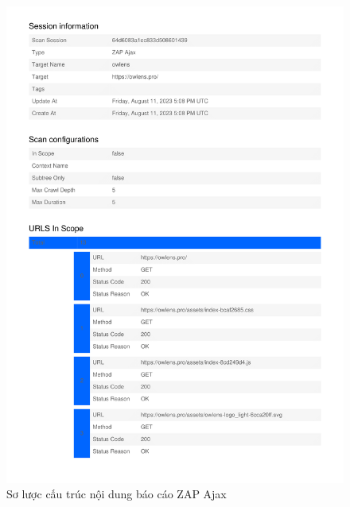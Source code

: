 \begin{figure}[H]
      \centering
      \includegraphics[width=\textwidth]{applied-thesis-chapters/chapter-6/Sơ lược cấu trúc nội dung báo cáo ZAP Ajax.png}
      \caption{Sơ lược cấu trúc nội dung báo cáo ZAP Ajax}
      \label{fig:SoLuocCauTrucNoiDungBaoCaoZapAjax}
\end{figure}

